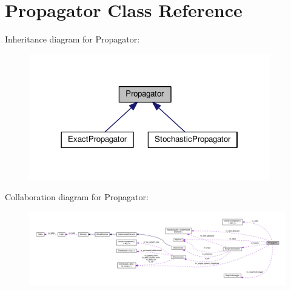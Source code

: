 \hypertarget{classPropagator}{}\section{Propagator Class Reference}
\label{classPropagator}


Inheritance diagram for Propagator\+:
\nopagebreak
\begin{figure}[H]
\begin{center}
\leavevmode
\includegraphics[width=298pt]{classPropagator__inherit__graph}
\end{center}
\end{figure}


Collaboration diagram for Propagator\+:
\nopagebreak
\begin{figure}[H]
\begin{center}
\leavevmode
\includegraphics[width=350pt]{classPropagator__coll__graph}
\end{center}
\end{figure}
